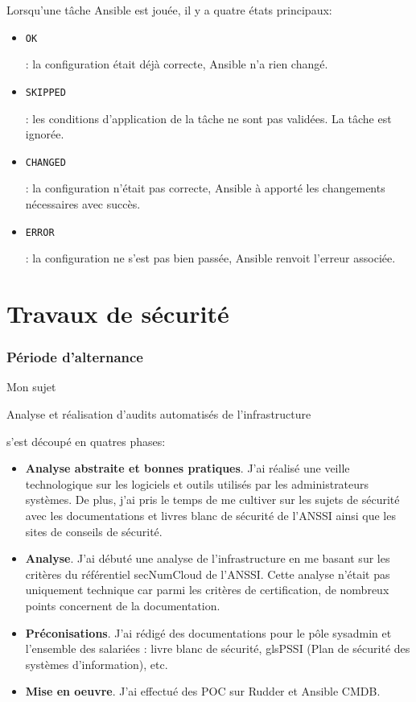 \documentclass[12pt]{article}
\begin{document}
Lorsqu'une tâche \gls{Ansible} est jouée, il y a quatre états principaux:
\begin{itemize}
    \item \begin{code}\texttt{OK}\end{code}: la configuration était déjà correcte, \gls{Ansible} n'a rien changé.
    \item \begin{code}\texttt{SKIPPED}\end{code}: les conditions d'application de la tâche ne sont pas validées. La tâche est ignorée.
    \item \begin{code}\texttt{CHANGED}\end{code}: la configuration n'était pas correcte, \gls{Ansible} à apporté les changements nécessaires avec succès.
    \item \begin{code}\texttt{ERROR}\end{code}: la configuration ne s'est pas bien passée, \gls{Ansible} renvoit l'erreur associée.
\end{itemize}

\newpage
\part{Travaux de sécurité}
\section{Période d'alternance}
Mon sujet \begin{hilite} Analyse et réalisation d'audits automatisés de l'infrastructure \end{hilite} s'est découpé en quatres phases:

\begin{itemize}
    \item \textbf{Analyse abstraite et bonnes pratiques}. J'ai réalisé une veille technologique sur les logiciels et outils utilisés par les administrateurs systèmes. 
    De plus, j'ai pris le temps de me cultiver sur les sujets de sécurité avec les documentations et livres blanc de sécurité de l'\gls{ANSSI} ainsi que les sites de conseils de sécurité.
    \item \textbf{Analyse}. J'ai débuté une analyse de l'infrastructure en me basant sur les critères du référentiel secNumCloud de l'\gls{ANSSI}. 
    Cette analyse n'était pas uniquement technique car parmi les critères de certification, de nombreux points concernent de la documentation.
    \item \textbf{Préconisations}. J'ai rédigé des documentations pour le pôle \gls{sysadmin} et l'ensemble des salariées : livre blanc de sécurité, gls{PSSI} (Plan de sécurité des systèmes d'information), etc.
    \item \textbf{Mise en oeuvre}. J'ai effectué des \gls{POC} sur Rudder et \gls{Ansible CMDB}.
\end{itemize}
\end{document}
